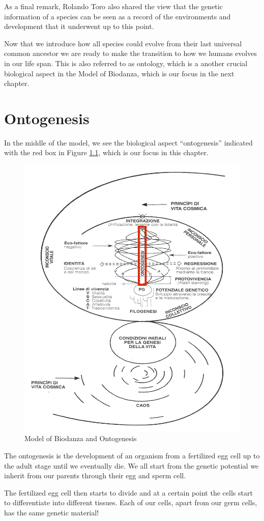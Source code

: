 \documentclass[
  11pt,
]{book}
\begin{document}
As a final remark, Rolando Toro also shared the view that the genetic information of a species can be seen as a record of the environments and development that it underwent up to this point.

Now that we introduce how all species could evolve from their last universal common ancestor we are ready to make the transition to how we humans evolves in our life span. This is also referred to as ontology, which is a another crucial biological aspect in the Model of Biodanza, which is our focus in the next chapter.

\hypertarget{ontogenesis}{%
\chapter{Ontogenesis}\label{ontogenesis}}

In the middle of the model, we see the biological aspect ``ontogenesis'' indicated with the red box in Figure \ref{fig:modelOnto}, which is our focus in this chapter.

\begin{figure}

{\centering \includegraphics[width=0.5\linewidth]{./figs/biologischeAspectenBiodanzaDeelIII} 

}

\caption{Model of Biodanza and Ontogenesis}\label{fig:modelOnto}
\end{figure}

The ontogenesis is the development of an organism from a fertilized egg cell up to the adult stage until we eventually die.
We all start from the genetic potential we inherit from our parents through their egg and sperm cell.

The fertilized egg cell then starts to divide and at a certain point the cells start to differentiate into different tissues.
Each of our cells, apart from our germ cells, has the same genetic material!
\end{document}
